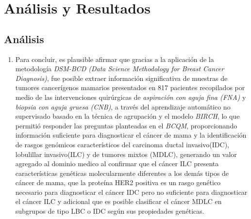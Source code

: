 \chapter{Análisis y Resultados}

\section{Análisis}
\begin{enumerate}[label=\HandPencilLeft]
	\item Para concluir, es plausible afirmar que gracias a la aplicación de la metodología \textit{DSM-BCD (Data Science Methodology for Breast Cancer Diagnosis)}, fue posible extraer información significativa de muestras de tumores cancerígenos mamarios presentados en 817 pacientes recopilados por medio de las intervenciones quirúrgicas de \textit{aspiración con aguja fina (FNA)} y \textit{biopsia con aguja gruesa (CNB)}, a través del aprendizaje automático no supervisado basado en la técnica de agrupación y el modelo \textit{BIRCH}, lo que permitió responder las preguntas planteadas en el \textit{BCQM}, proporcionando información suficiente para diagnosticar el cáncer de mama y la identificación de  rasgos genómicos característicos del carcinoma ductal invasivo(IDC), lobulillar invasivo(ILC) y de tumores mixtos (MDLC), generando un valor agregado al dominio medico al confirmar que el cáncer ILC presenta características genéticas molecularmente diferentes a los demás tipos de cáncer de mama, que  la proteína HER2 positiva es un rasgo genético necesario para diagnosticar el cáncer IDC pero no suficiente para diagnosticar el cáncer ILC y adicional que es posible clasificar el cáncer MDLC en subgrupos de tipo LBC o IDC según sus propiedades genéticas.
\end{enumerate}

\newpage
